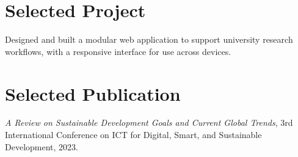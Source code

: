 \section{Selected Project}
Designed and built a modular web application to support university research
workflows, with a responsive interface for use across devices.

\section{Selected Publication}
\textit{A Review on Sustainable Development Goals and Current Global Trends},
3rd International Conference on ICT for Digital, Smart, and Sustainable
Development, 2023.
